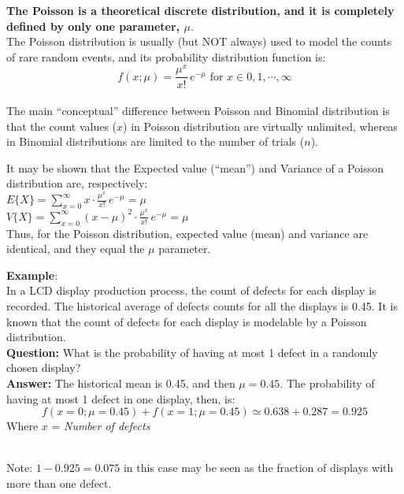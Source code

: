 
\begin{frame}
  \vspace*{.25cm}
  \textbf{The Poisson is a theoretical discrete distribution, and it is completely defined by only one parameter, {\boldmath $ \mu $}}.\\
  \vspace*{.5cm}
  The Poisson distribution is usually (but NOT always) used to  model the counts of rare random events, and its probability distribution function is:
  $$
    f(x;\mu)=\frac{\mu^x}{x!}\, e^{-\mu}  \mbox{     for } x \in {0, 1, \cdots, \infty}
  $$\\
  \vspace*{.5cm}
  The main ``conceptual'' difference between Poisson and Binomial distribution is that the count values ($x$) in Poisson distribution are virtually unlimited, whereas in Binomial distributions are limited to the number of trials ($n$).
\end{frame}

\begin{frame}
  It may be shown that the Expected value (``mean'') and Variance of a Poisson distribution are, respectively:\\
  \vspace*{1cm}
  $E\{X\}=\displaystyle\sum_{x=0}^\infty x \cdot \frac{\mu^x}{x!}\, e^{-\mu}=\mu$\\
  \vspace*{1cm}
  $ V\{X\}=\displaystyle\sum_{x=0}^\infty (x-\mu)^2 \cdot \frac{\mu^x}{x!}\, e^{-\mu}= \mu$\\
  \vspace*{1cm}
  Thus, for the Poisson distribution, expected value (mean) and variance are identical, and they equal the $\mu$ parameter.
\end{frame}

\begin{frame}
  \begin{small}
  \textbf{Example}:\\
    In a LCD display production process, the count of defects for each display is recorded. The historical average of defects counts for all the displays is 0.45. It is known that the count of defects for each display is modelable by a Poisson distribution. \\
    \textbf{Question:} What is the probability of having at most 1 defect in a randomly chosen display?\\
    \vspace{.15cm}
    \textbf{Answer:} The historical mean is 0.45, and then $\mu=0.45$. The probability of having at most 1 defect in one display, then, is:
    $$ f(x=0;\mu=0.45) + f(x=1;\mu=0.45) \simeq 0.638 + 0.287 = 0.925$$ 
    \vspace*{.4cm}
    Where $x$ = \textit{Number of defects}\\ \vspace{-.5cm} \hspace*{11cm} \Square \\
  \end{small}
  Note: $1-0.925 = 0.075$ in this case may be seen as the fraction of displays with more than one defect.
\end{frame}

